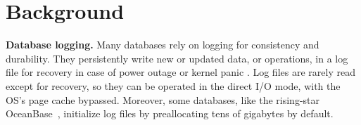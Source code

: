 \section{Background}\label{sec:background}


{\bf  Database logging.} %
Many databases rely on logging for consistency and durability.
They  persistently write  new or updated data, or operations, in a log file  for recovery in case of power outage or kernel panic
\cite{DB:OceanBase:VLDB-2022,lee2015waldio,mysql2013mysql}.
Log files are rarely read except for recovery, so they can be operated in the direct I/O mode, with the OS's page cache bypassed.
 Moreover, some databases, like the rising-star OceanBase~\cite{DB:OceanBase:VLDB-2022},
   initialize
  log files by preallocating tens of gigabytes by default. 




